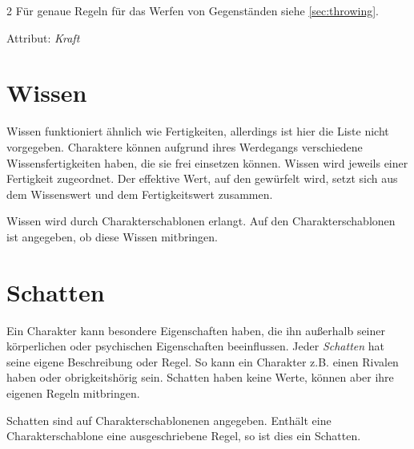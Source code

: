 \begin{multicols}{2}
Für genaue Regeln für das Werfen von Gegenständen siehe \cref{sec:throwing}.

Attribut: \textit{Kraft}


\section{Wissen}

Wissen funktioniert ähnlich wie Fertigkeiten, allerdings ist hier die Liste nicht vorgegeben. Charaktere können aufgrund ihres Werdegangs verschiedene Wissensfertigkeiten haben, die sie frei einsetzen können. Wissen wird jeweils einer Fertigkeit zugeordnet. Der effektive Wert, auf den gewürfelt wird, setzt sich aus dem Wissenswert und dem Fertigkeitswert zusammen.

Wissen wird durch Charakterschablonen erlangt. Auf den Charakterschablonen ist angegeben, ob diese Wissen mitbringen.

\section{Schatten}

Ein Charakter kann besondere Eigenschaften haben, die ihn außerhalb seiner körperlichen oder psychischen Eigenschaften beeinflussen. Jeder \textit{Schatten} hat seine eigene Beschreibung oder Regel. So kann ein Charakter z.B. einen Rivalen haben oder obrigkeitshörig sein. Schatten haben keine Werte, können aber ihre eigenen Regeln mitbringen.

Schatten sind auf Charakterschablonenen angegeben. Enthält eine Charakterschablone eine ausgeschriebene Regel, so ist dies ein Schatten.


\end{multicols}
